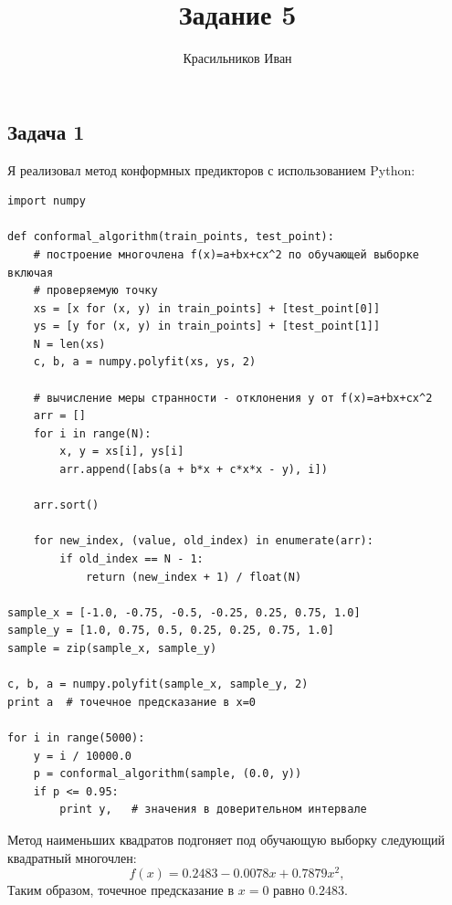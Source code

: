 \documentclass[a4paper, 12pt, onepage]{article}
\begin{document}
\author{Красильников Иван}
\title{Задание 5}
\maketitle

\subsection*{Задача 1}
Я реализовал метод конформных предикторов с использованием Python:
{
\footnotesize
\begin{verbatim}
import numpy

def conformal_algorithm(train_points, test_point):
    # построение многочлена f(x)=a+bx+cx^2 по обучающей выборке включая
    # проверяемую точку
    xs = [x for (x, y) in train_points] + [test_point[0]]
    ys = [y for (x, y) in train_points] + [test_point[1]]
    N = len(xs)
    c, b, a = numpy.polyfit(xs, ys, 2)

    # вычисление меры странности - отклонения y от f(x)=a+bx+cx^2
    arr = []
    for i in range(N):
        x, y = xs[i], ys[i]
        arr.append([abs(a + b*x + c*x*x - y), i])

    arr.sort()

    for new_index, (value, old_index) in enumerate(arr):
        if old_index == N - 1:
            return (new_index + 1) / float(N)

sample_x = [-1.0, -0.75, -0.5, -0.25, 0.25, 0.75, 1.0]
sample_y = [1.0, 0.75, 0.5, 0.25, 0.25, 0.75, 1.0]
sample = zip(sample_x, sample_y)

c, b, a = numpy.polyfit(sample_x, sample_y, 2)
print a  # точечное предсказание в x=0

for i in range(5000):
    y = i / 10000.0
    p = conformal_algorithm(sample, (0.0, y))
    if p <= 0.95:
        print y,   # значения в доверительном интервале
\end{verbatim}
}

Метод наименьших квадратов подгоняет под обучающую выборку следующий квадратный многочлен:
$$ f(x) = 0.2483 - 0.0078x + 0.7879x^2, $$
Таким образом, точечное предсказание в $x=0$ равно $0.2483$.
\end{document}
